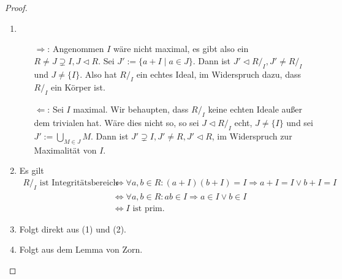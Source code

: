 \begin{proof}{\ }
    \begin{enumerate}
        \item \begin{itemize}
            \item[$\Rightarrow$:] Angenommen $I$ wäre nicht maximal, es gibt also ein $R \neq J \supsetneq I, J \vartriangleleft R$.
            Sei $J' := \{ a + I \mid a \in J \}$. Dann ist $J' \vartriangleleft R/_I, J' \neq R/_I$ und $J \neq \{I\}$. Also hat $R/_I$ ein echtes Ideal, im Widerspruch dazu, dass $R/_I$ ein Körper ist.
            \item[$\Leftarrow$:] Sei $I$ maximal. Wir behaupten, dass $R/_I$ keine echten Ideale außer dem trivialen hat. Wäre dies nicht so, so sei $J \vartriangleleft R/_I$ echt, $J \neq \{I\}$ und sei $J' := \bigcup_{M \in J} M$. Dann ist $J' \supsetneq I, J' \neq R, J' \vartriangleleft R$, im Widerspruch zur Maximalität von $I$.
        \end{itemize}
        \item Es gilt
        \begin{align*}
            R/_I \text{ ist Integritätsbereich} &\Leftrightarrow \forall a, b \in R: (a + I)(b + I) = I \Rightarrow a + I = I \lor b + I = I \\
            &\Leftrightarrow \forall a, b \in R: ab \in I \Rightarrow a \in I \lor b \in I \\
            &\Leftrightarrow I \text{ ist prim}.
        \end{align*}
        \item Folgt direkt aus (1) und (2).
        \item Folgt aus dem Lemma von Zorn.
    \end{enumerate}
\end{proof}